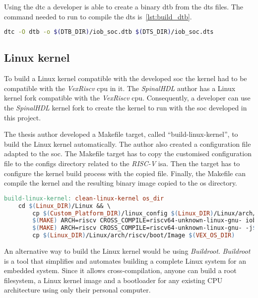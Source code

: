 Using the \acrfull{dtc} a developer is able to create a binary \acrfull{dtb} from the \acrfull{dts} files. The command needed to run to compile the \acrshort{dts} is~\ref{lst:build_dtb}.

\begin{lstlisting}[language=bash, caption={Makefile target to build the device tree blob.}, label=lst:build_dtb]
dtc -O dtb -o $(DTB_DIR)/iob_soc.dtb $(DTS_DIR)/iob_soc.dts
\end{lstlisting}

\subsection{Linux kernel}
To build a Linux kernel compatible with the developed \acrshort{soc} the kernel had to be compatible with the \textit{VexRiscv} \acrshort{cpu} in it. The \textit{SpinalHDL} author has a Linux kernel fork compatible with the \textit{VexRiscv} \acrshort{cpu}. Consequently, a developer can use the \textit{SpinalHDL} kernel fork to create the kernel to run with the \acrshort{soc} developed in this project.

The thesis author developed a Makefile target, called \enquote{build-linux-kernel}, to build the Linux kernel automatically. The author also created a configuration file adapted to the \acrshort{soc}. The Makefile target has to copy the customised configuration file to the configs directory related to the \textit{RISC-V} \acrshort{isa}. Then the target has to configure the kernel build process with the copied file. Finally, the Makefile can compile the kernel and the resulting binary image copied to the \acrshort{os} directory.

\begin{lstlisting}[language=make, caption={Root file system Makefile target.}, label=lst:rootfs_makefile]
build-linux-kernel: clean-linux-kernel os_dir
    cd $(Linux_DIR)/Linux && \
        cp $(Custom_Platform_DIR)/linux_config $(Linux_DIR)/Linux/arch/riscv/configs/iob_soc_defconfig && \
        $(MAKE) ARCH=riscv CROSS_COMPILE=riscv64-unknown-linux-gnu- iob_soc_defconfig && \
        $(MAKE) ARCH=riscv CROSS_COMPILE=riscv64-unknown-linux-gnu- -j$(nproc) && \
        cp $(Linux_DIR)/Linux/arch/riscv/boot/Image $(VEX_OS_DIR)
\end{lstlisting}

An alternative way to build the Linux kernel would be using \textit{Buildroot}. \textit{Buildroot}~\cite{petazzoni2012buildroot} is a tool that simplifies and automates building a complete Linux system for an embedded system. Since it allows cross-compilation, anyone can build a root filesystem, a Linux kernel image and a bootloader for any existing CPU architecture using only their personal computer.

